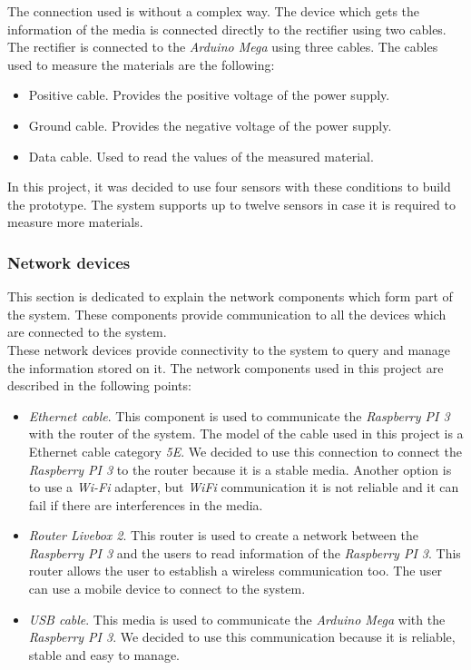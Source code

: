 The connection used is without a complex way. The device which gets the information of the media is connected directly to the rectifier using two cables. The rectifier is connected to the \textit{Arduino Mega} using three cables. The cables used to measure the materials are the following:

\begin{itemize}

\item Positive cable. Provides the positive voltage of the power supply.
\item Ground cable. Provides the negative voltage of the power supply.
\item Data cable. Used to read the values of the measured material.

\end{itemize}

In this project, it was decided to use four sensors with these conditions to build the prototype. The system supports up to twelve sensors in case it is required to measure more materials.

\subsubsection{Network devices}

This section is dedicated to explain the network components which form part of the system. These components provide communication to all the devices which are connected to the system.\\ 

These network devices provide connectivity to the system to query and manage the information stored on it. The network components used in this project are described in the following points:\\

\begin{itemize}

\item \textit{Ethernet cable}. This component is used to communicate the \textit{Raspberry PI 3} with the router of the system. The model of the cable used in this project is a Ethernet cable category \textit{5E}. We decided to use this connection to connect the \textit{Raspberry PI 3} to the router because it is a stable media. Another option is to use a \textit{Wi-Fi} adapter, but \textit{WiFi} communication it is not reliable and it can fail if there are interferences in the media.

\item \textit{Router Livebox 2}. This router is used to create a network between the \textit{Raspberry PI 3} and the users to read information of the \textit{Raspberry PI 3}. This router allows the user to establish a wireless communication too. The user can use a mobile device to connect to the system.

\item \textit{USB cable}. This media is used to communicate the \textit{Arduino Mega} with the \textit{Raspberry PI 3}. We decided to use this communication because it is reliable, stable and easy to manage.

\end{itemize}

